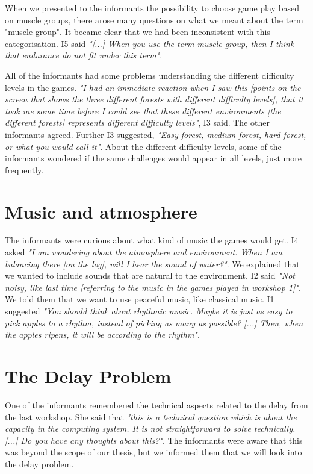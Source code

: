 When we presented to the informants the possibility to choose game play based on muscle groups, there arose many questions on what we meant about the term "muscle group". It became clear that we had been inconsistent with this categorisation. I5 said \emph{"[...] When you use the term muscle group, then I think that endurance do not fit under this term"}.   

All of the informants had some problems understanding the different difficulty levels in the games. \emph{"I had an immediate reaction when I saw this [points on the screen that shows the three different forests with different difficulty levels], that it took me some time before I could see that these different environments [the different forests] represents different difficulty levels"}, I3 said. The other informants agreed. Further I3 suggested, \emph{"Easy forest, medium forest, hard forest, or what you would call it"}. About the different difficulty levels, some of the informants wondered if the same challenges would appear in all levels, just more frequently. 

\section{Music and atmosphere}

The informants were curious about what kind of music the games would get. I4 asked \emph{"I am wondering about the atmosphere and environment. When I am balancing there [on the log], will I hear the sound of water?"}. We explained that we wanted to include sounds that are natural to the environment. I2 said \emph{"Not noisy, like last time [referring to the music in the games played in workshop 1]"}. We told them that we want to use peaceful music, like classical music. I1 suggested \emph{"You should think about rhythmic music. Maybe it is just as easy to pick apples to a rhythm, instead of picking as many as possible? [...] Then, when the apples ripens, it will be according to the rhythm"}. 

\section{The Delay Problem}


One of the informants remembered the technical aspects related to the delay from the last workshop. She said that \emph{"this is a technical question which is about the capacity in the computing system. It is not straightforward to solve technically. [...] Do you have any thoughts about this?"}. The informants were aware that this was beyond the scope of our thesis, but we informed them that we will look into the delay problem.

